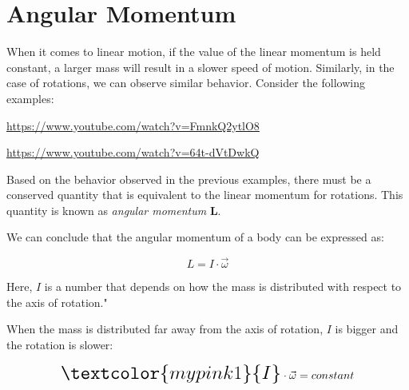 \documentclass[]{beamer}
\begin{document}
\section{Angular Momentum}
\begin{frame}

  When it comes to linear motion, if the value of the linear momentum is held constant, 
  a larger mass will result in a slower speed of motion. Similarly, in the case of rotations, 
  we can observe similar behavior. Consider the following examples:
\pause
\vspace{3mm}

\begin{center}
 \url{https://www.youtube.com/watch?v=FmnkQ2ytlO8}

\url{https://www.youtube.com/watch?v=64t-dVtDwkQ}
\end{center}
\pause
\vspace{3mm}



\end{frame}



\begin{frame}
  Based on the behavior observed in the previous examples, there must be
  a conserved quantity that is equivalent to the linear momentum for rotations. 
  This quantity is known as \textit{angular momentum} \textbf{L}.
  
  \pause
  \vspace{3mm}

  We can conclude that the angular momentum of a body can be expressed as:

  \begin{equation}
  L=I \cdot \vec{\omega}
  \end{equation}
  
  Here, $I$ is a number that depends on how the mass is distributed with respect to the axis of rotation."
\end{frame}


\begin{frame}


  When the mass is distributed far away from the axis of rotation, $I$ is bigger and the rotation is slower:
 
 
\begin{equation}%
  \mbox{\fontsize{17.28}{21.6}\selectfont\(\textcolor{mypink1}{I}\)} \cdot \vec{\omega}=constant
\end{equation}
  
  \end{frame}
\end{document}
